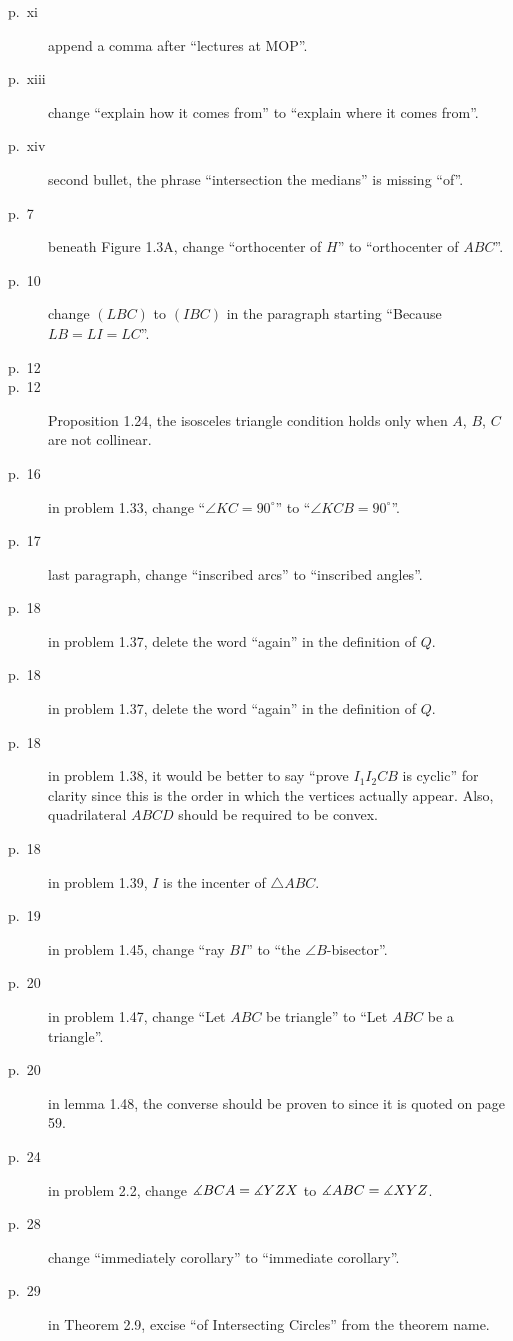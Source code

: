 \documentclass[11pt]{scrartcl}
\begin{document}
\begin{description}

\item[p.\  xi] append a comma after ``lectures at MOP''.
\item[p.\  xiii] change ``explain how it comes from'' to ``explain where it comes from''.
\item[p.\  xiv] second bullet, the phrase ``intersection the medians'' is missing ``of''.
\item[p.\  7] beneath Figure 1.3A, change ``orthocenter of $H$'' to ``orthocenter of $ABC$''.
\item[p.\  10] change $(LBC)$ to $(IBC)$ in the paragraph starting ``Because $LB=LI=LC$''.
\item[p.\  12] 
\item[p.\  12] Proposition 1.24, the isosceles triangle condition holds
  only when $A$, $B$, $C$ are not collinear.
\item[p.\  16] in problem 1.33, change ``$\angle KC=90^{\circ}$'' to ``$\angle KCB=90^{\circ}$''.
\item[p.\  17] last paragraph, change ``inscribed arcs'' to ``inscribed angles''.
\item[p.\  18] in problem 1.37, delete the word ``again'' in the definition of $Q$.
\item[p.\  18] in problem 1.37, delete the word ``again'' in the definition of $Q$.
\item[p.\  18] in problem 1.38, it would be better to say
  ``prove $I_1 I_2 C B$ is cyclic'' for clarity
  since this is the order in which the vertices actually appear.
  Also, quadrilateral $ABCD$ should be required to be convex.
\item[p.\  18] in problem 1.39, $I$ is the incenter of $\triangle ABC$.
\item[p.\  19] in problem 1.45, change ``ray $BI$'' to ``the $\angle B$-bisector''.
\item[p.\  20] in problem 1.47, change ``Let $ABC$ be triangle'' to ``Let $ABC$ be a triangle''.
\item[p.\  20] in lemma 1.48, the converse should be proven to since it is quoted on page 59.
\item[p.\  24] in problem 2.2, change $\measuredangle BCA = \measuredangle YZX$
  to $\measuredangle ABC = \measuredangle XYZ$.
\item[p.\  28] change ``immediately corollary'' to ``immediate corollary''.
\item[p.\  29] in Theorem 2.9, excise ``of Intersecting Circles'' from the theorem name.

\end{description}
\end{document}
